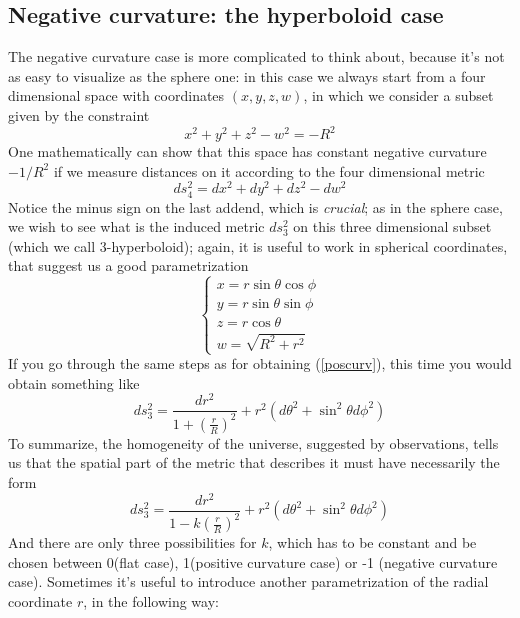 \documentclass[11pt, a4paper,oneside,openright]{book}
\numberwithin{equation}{section}
\begin{document}
\subsection{Negative curvature: the hyperboloid case}
The negative curvature case is more complicated to think about, because it's not as easy to visualize as the sphere one: in this case we always start from a four dimensional space with coordinates $(x,y,z,w)$, in which we consider a subset given by the constraint
\begin{equation}
x^2+y^2+z^2-w^2=-R^2
\end{equation}
One mathematically can show that this space has constant negative curvature $-1/R^2$ if we measure distances on it according to the four dimensional metric 
\begin{equation}
ds_4^2=dx^2+dy^2+dz^2-dw^2
\end{equation}
Notice the minus sign on the last addend, which is \textit{crucial}; as in the sphere case, we wish to see what is the induced metric $ds^2_3$ on this three dimensional subset (which we call 3-hyperboloid); again, it is useful to work in spherical coordinates, that suggest us a good parametrization
\begin{displaymath}
\left \{ \begin{array}{l}x=r\sin{\theta}\cos{\phi} \\ 
y=r\sin{\theta}\sin{\phi} \\ 
z=r\cos{\theta} \\
w= \sqrt{R^2+r^2} \end{array}  \right.  
\end{displaymath}
If you go through the same steps as for obtaining (\ref{poscurv}), this time you would obtain something like
\begin{equation}
\label{negcurv}
ds_3^2=\frac{dr^2}{1+\left(\frac{r}{R}\right)^2} + r^2(d\theta^2 + \sin^2{\theta}d\phi^2)
\end{equation}
To summarize, the homogeneity of the universe, suggested by observations, tells us that the spatial part of the metric that describes it must have necessarily the form 
\begin{equation}
\label{gencurv}
ds_3^2=\frac{dr^2}{1-k\left(\frac{r}{R}\right)^2} + r^2(d\theta^2 + \sin^2{\theta}d\phi^2)
\end{equation}
And there are only three possibilities for $k$, which has to be constant and be chosen between 0(flat case), 1(positive curvature case) or -1 (negative curvature case). Sometimes it's useful to introduce another parametrization of the radial coordinate $r$, in the following way: 
\end{document}
